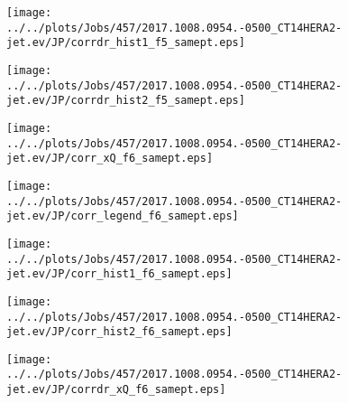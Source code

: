 \documentclass[12pt]{article}
\begin{document}
\begin{figure}
\texttt{[image: ../../plots/Jobs/457/2017.1008.0954.-0500\_CT14HERA2-jet.ev/JP/corrdr\_hist1\_f5\_samept.eps]}
\caption{}
\end{figure}\newpage\clearpage
\begin{figure}
\texttt{[image: ../../plots/Jobs/457/2017.1008.0954.-0500\_CT14HERA2-jet.ev/JP/corrdr\_hist2\_f5\_samept.eps]}
\caption{}
\end{figure}\newpage\clearpage
\begin{figure}
\texttt{[image: ../../plots/Jobs/457/2017.1008.0954.-0500\_CT14HERA2-jet.ev/JP/corr\_xQ\_f6\_samept.eps]}
\caption{}
\end{figure}\newpage\clearpage
\begin{figure}
\texttt{[image: ../../plots/Jobs/457/2017.1008.0954.-0500\_CT14HERA2-jet.ev/JP/corr\_legend\_f6\_samept.eps]}
\caption{}
\end{figure}\newpage\clearpage
\begin{figure}
\texttt{[image: ../../plots/Jobs/457/2017.1008.0954.-0500\_CT14HERA2-jet.ev/JP/corr\_hist1\_f6\_samept.eps]}
\caption{}
\end{figure}\newpage\clearpage
\begin{figure}
\texttt{[image: ../../plots/Jobs/457/2017.1008.0954.-0500\_CT14HERA2-jet.ev/JP/corr\_hist2\_f6\_samept.eps]}
\caption{}
\end{figure}\newpage\clearpage
\begin{figure}
\texttt{[image: ../../plots/Jobs/457/2017.1008.0954.-0500\_CT14HERA2-jet.ev/JP/corrdr\_xQ\_f6\_samept.eps]}
\caption{}
\end{figure}\newpage\clearpage
\end{document}
